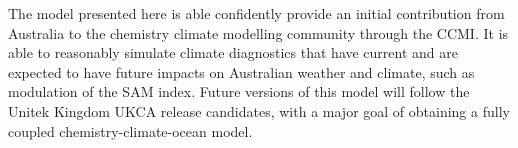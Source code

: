 The model presented here is able confidently provide an initial contribution from Australia to the chemistry climate modelling community through the CCMI. It is able to reasonably simulate climate diagnostics that have current and are expected to have future impacts on Australian weather and climate, such as modulation of the SAM index. Future versions of this model will follow the Unitek Kingdom UKCA release candidates, with a major goal of obtaining a fully coupled chemistry-climate-ocean model.